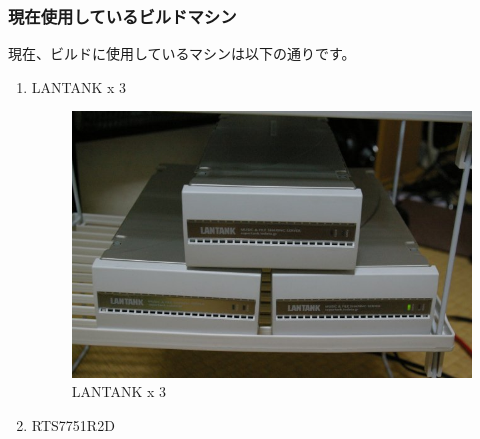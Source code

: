\documentclass[mingoth,a4paper]{jsarticle}
\begin{document}
\newpage

\subsubsection{現在使用しているビルドマシン}

現在、ビルドに使用しているマシンは以下の通りです。

\begin{enumerate}

\item LANTANK x 3

\begin{figure}[htbp]
  \includegraphics[width=0.8\hsize]{image200705/lantank01.jpg}
  \caption{LANTANK x 3} 
\end{figure}

\item RTS7751R2D


\end{enumerate}
\end{document}
